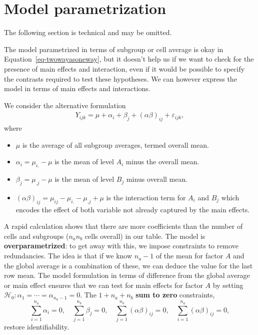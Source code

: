 \documentclass[
  11pt,
  letterpaper,
]{scrbook}
\providecommand{\tightlist}{%
  \setlength{\itemsep}{0pt}\setlength{\parskip}{0pt}}\usepackage{longtable,booktabs,array}
\theoremstyle{definition}
\theoremstyle{remark}
\begin{document}
\hypertarget{model-parametrization}{%
\section{Model parametrization}\label{model-parametrization}}

The following section is technical and may be omitted.

The model parametrized in terms of subgroup or cell average is okay in
Equation~\ref{eq-twowayasoneway}, but it doesn't help us if we want to
check for the presence of main effects and interaction, even if it would
be possible to specify the contrasts required to test these hypotheses.
We can however express the model in terms of main effects and
interactions.

We consider the alternative formulation \begin{align*}
Y_{ijk} = \mu + \alpha_i + \beta_j + (\alpha\beta)_{ij} + \varepsilon_{ijk},
\end{align*} where

\begin{itemize}
\tightlist
\item
  \(\mu\) is the average of all subgroup averages, termed overall mean.
\item
  \(\alpha_i = \mu_{i.} - \mu\) is the mean of level \(A_i\) minus the
  overall mean.
\item
  \(\beta_j = \mu_{.j} - \mu\) is the mean of level \(B_j\) minus
  overall mean.
\item
  \((\alpha\beta)_{ij} = \mu_{ij} - \mu_{i.} - \mu_{.j} + \mu\) is the
  interaction term for \(A_i\) and \(B_j\) which encodes the effect of
  both variable not already captured by the main effects.
\end{itemize}

A rapid calculation shows that there are more coefficients than the
number of cells and subgroups (\(n_an_b\) cells overall) in our table.
The model is \textbf{overparametrized}: to get away with this, we impose
constraints to remove redundancies. The idea is that if we know
\(n_a-1\) of the mean for factor \(A\) and the global average is a
combination of these, we can deduce the value for the last row mean. The
model formulation in terms of difference from the global average or main
effect ensures that we can test for main effects for factor \(A\) by
setting \(\mathscr{H}_0: \alpha_1 = \cdots = \alpha_{n_a-1}=0\). The
\(1 + n_a + n_b\) \textbf{sum to zero} constraints,
\[\sum_{i=1}^{n_a} \alpha_i=0, \quad \sum_{j=1}^{n_b} \beta_j=0, \quad  \sum_{j=1}^{n_b} (\alpha\beta)_{ij}=0, \quad \sum_{i=1}^{n_a} (\alpha\beta)_{ij}=0,\]
restore identifiability.
\end{document}
